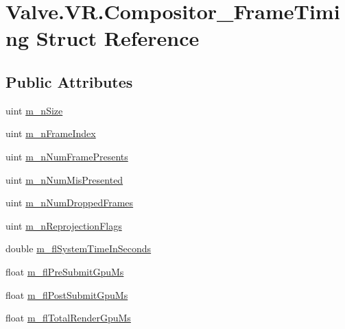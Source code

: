 \hypertarget{struct_valve_1_1_v_r_1_1_compositor___frame_timing}{}\section{Valve.\+V\+R.\+Compositor\+\_\+\+Frame\+Timing Struct Reference}
\label{struct_valve_1_1_v_r_1_1_compositor___frame_timing}
\subsection*{Public Attributes}
\begin{DoxyCompactItemize}
\item 
uint \mbox{\hyperlink{struct_valve_1_1_v_r_1_1_compositor___frame_timing_a016bda0a11d847916110b85b0c04f595}{m\+\_\+n\+Size}}
\item 
uint \mbox{\hyperlink{struct_valve_1_1_v_r_1_1_compositor___frame_timing_af3c783a5d909116dba7d8e8e9522b5ed}{m\+\_\+n\+Frame\+Index}}
\item 
uint \mbox{\hyperlink{struct_valve_1_1_v_r_1_1_compositor___frame_timing_a8f6c14d9683f944609b7a5277ac53db7}{m\+\_\+n\+Num\+Frame\+Presents}}
\item 
uint \mbox{\hyperlink{struct_valve_1_1_v_r_1_1_compositor___frame_timing_ae3da2c4dfe655f0fbc7403a66664ab4b}{m\+\_\+n\+Num\+Mis\+Presented}}
\item 
uint \mbox{\hyperlink{struct_valve_1_1_v_r_1_1_compositor___frame_timing_af3016af58c78eaf259a0c95784b3dcf3}{m\+\_\+n\+Num\+Dropped\+Frames}}
\item 
uint \mbox{\hyperlink{struct_valve_1_1_v_r_1_1_compositor___frame_timing_a011ef9557833a41a946cc3fe1e16f5e2}{m\+\_\+n\+Reprojection\+Flags}}
\item 
double \mbox{\hyperlink{struct_valve_1_1_v_r_1_1_compositor___frame_timing_a7a5d2de7efbfd916f49eaa185fa8bded}{m\+\_\+fl\+System\+Time\+In\+Seconds}}
\item 
float \mbox{\hyperlink{struct_valve_1_1_v_r_1_1_compositor___frame_timing_aada6cc624154ee21c396f53b2aea4af3}{m\+\_\+fl\+Pre\+Submit\+Gpu\+Ms}}
\item 
float \mbox{\hyperlink{struct_valve_1_1_v_r_1_1_compositor___frame_timing_a5b742a2304d83268c90e2c0e2bcc63cd}{m\+\_\+fl\+Post\+Submit\+Gpu\+Ms}}
\item 
float \mbox{\hyperlink{struct_valve_1_1_v_r_1_1_compositor___frame_timing_a55277d19c551c1bda9d9ccec7bb3a3c2}{m\+\_\+fl\+Total\+Render\+Gpu\+Ms}}
\item 

\end{DoxyCompactItemize}
